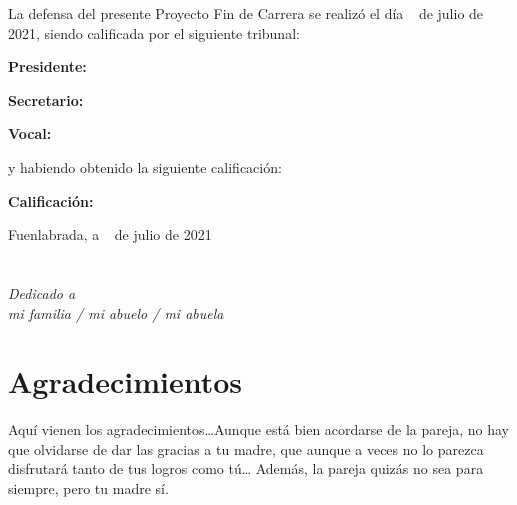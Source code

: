 \documentclass[a4paper, 12pt]{book}
\begin{document}
\vspace{1cm}
La defensa del presente Proyecto Fin de Carrera se realizó el día \qquad$\;\,$ de julio \newline de 2021, siendo calificada por el siguiente tribunal:


\vspace{0.5cm}
\textbf{Presidente:}

\vspace{1.2cm}
\textbf{Secretario:}

\vspace{1.2cm}
\textbf{Vocal:}


\vspace{1.2cm}
y habiendo obtenido la siguiente calificación:

\vspace{1cm}
\textbf{Calificación:}


\vspace{1cm}
\begin{flushright}
Fuenlabrada, a \qquad$\;\,$ de julio de 2021
\end{flushright}


\chapter*{}
\begin{flushright}
\textit{Dedicado a \\
mi familia / mi abuelo / mi abuela}
\end{flushright}


\chapter*{Agradecimientos}

Aquí vienen los agradecimientos\ldots Aunque está bien acordarse de la pareja, no hay que olvidarse de dar las gracias a tu madre, que aunque a veces no lo parezca disfrutará tanto de tus logros como tú\ldots 
Además, la pareja quizás no sea para siempre, pero tu madre sí.
\end{document}
